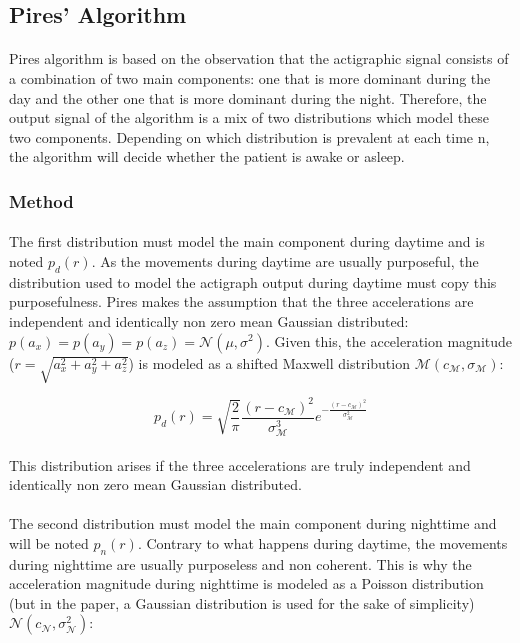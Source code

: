 \documentclass[a4paper,12pt]{article}
\begin{document}
\subsection{Pires' Algorithm}

\paragraph{}
Pires algorithm \cite{Pires2009} is based on the observation that the actigraphic signal consists of a combination of two main components: one that is more dominant during the day and the other one that is more dominant during the night. Therefore, the output signal of the algorithm is a mix of two distributions which model these two components. Depending on which distribution is prevalent at each time n, the algorithm will decide whether the patient is awake or asleep.

\subsubsection{Method}

\paragraph{}
The first distribution must model the main component during daytime and is noted $p_d(r)$. As the movements during daytime are usually purposeful, the distribution used to model the actigraph output during daytime must copy this purposefulness. Pires makes the assumption that the three accelerations are independent and identically non zero mean Gaussian distributed: $p(a_x) = p(a_y) = p(a_z) = \mathcal{N}(\mu, \sigma^2)$. Given this, the acceleration magnitude ($r = \sqrt{a_x^2 + a_y^2 + a_z^2}$) is modeled as a shifted Maxwell distribution $\mathcal{M}(c_\mathcal{M}, \sigma_\mathcal{M})$:

\begin{equation}
p_d(r) = \sqrt{\frac{2}{\pi}} \frac{(r - c_{\mathcal{M}})^2}{\sigma_{\mathcal{M}}^3} e^{-\frac{(r - c_{\mathcal{M}})^2}{\sigma_{\mathcal{M}}^2}}
\end{equation}

\paragraph{}
This distribution arises if the three accelerations are truly independent and identically non zero mean Gaussian distributed.

\paragraph{}
The second distribution must model the main component during nighttime and will be noted $p_n(r)$. Contrary to what happens during daytime, the movements during nighttime are usually purposeless and non coherent. This is why the acceleration magnitude during nighttime is modeled as a Poisson distribution (but in the paper, a Gaussian distribution is used for the sake of simplicity) $\mathcal{N}(c_\mathcal{N}, \sigma_\mathcal{N}^2)$:
\end{document}

